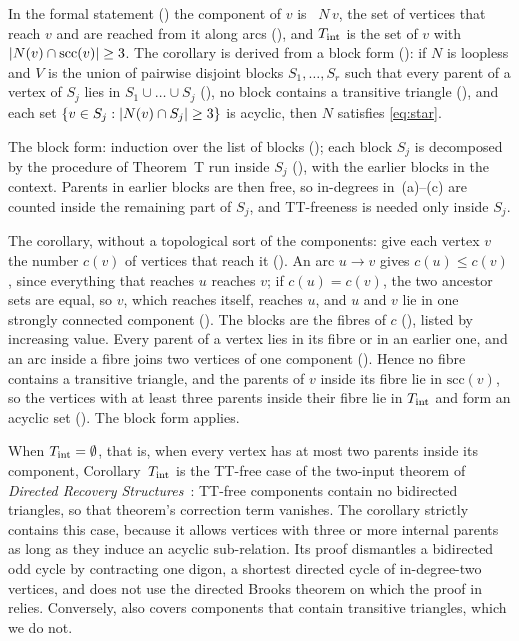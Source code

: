 In the formal statement () the component of $v$ is ~$N\,v$, the set of vertices that
reach $v$ and are reached from it along arcs (), and $T_{\mathrm{int}}$ is the set of $v$ with
$\lvert N(v)\cap\mathrm{scc}(v) \rvert\ge3$. The corollary is derived from a block form (): if $N$ is
loopless and $V$ is the union of pairwise disjoint blocks $S_1,\dots,S_r$ such that every parent of a vertex of $S_j$
lies in $S_1\cup\dots\cup S_j$ (), no block contains a transitive triangle (), and each
set $\{v\in S_j:\lvert N(v)\cap S_j \rvert\ge3\}$ is acyclic, then $N$ satisfies \eqref{eq:star}.

\begin{outline}
The block form: induction over the list of blocks (); each block $S_j$ is decomposed by the
procedure of Theorem~T run inside $S_j$ (), with the earlier blocks in the context. Parents in earlier
blocks are then free, so in-degrees in~(a)--(c) are counted inside the remaining part of $S_j$, and TT-freeness is needed
only inside $S_j$.

The corollary, without a topological sort of the components: give each vertex $v$ the number $c(v)$ of vertices that
reach it (). An arc $u\to v$ gives $c(u)\le c(v)$, since everything that reaches $u$ reaches $v$; if
$c(u)=c(v)$, the two ancestor sets are equal, so $v$, which reaches itself, reaches $u$, and $u$ and $v$ lie in one
strongly connected component (). The blocks are the fibres of $c$ (), listed by
increasing value. Every parent of a vertex lies in its fibre or in an earlier one, and an arc inside a fibre joins two
vertices of one component (). Hence no fibre contains a transitive triangle, and the parents of
$v$ inside its fibre lie in $\mathrm{scc}(v)$, so the vertices with at least three parents inside their fibre lie in
$T_{\mathrm{int}}$ and form an acyclic set (). The block form applies.
\end{outline}

When $T_{\mathrm{int}}=\emptyset$, that is, when every vertex has at most two parents inside its component, Corollary~$T_{\mathrm{int}}$ is
the TT-free case of the two-input theorem of \emph{Directed Recovery
Structures}~\cite[Theorem~5.1]{DirectedRecovery2026}: TT-free components contain no bidirected triangles, so that
theorem's correction term vanishes. The corollary strictly contains this case, because it allows vertices with three or
more internal parents as long as they induce an acyclic sub-relation. Its proof dismantles a bidirected odd cycle by
contracting one digon, a shortest directed cycle of in-degree-two vertices, and does not use the directed Brooks
theorem on which the proof in~\cite{DirectedRecovery2026} relies. Conversely, \cite[Theorem~5.1]{DirectedRecovery2026}
also covers components that contain transitive triangles, which we do not.

